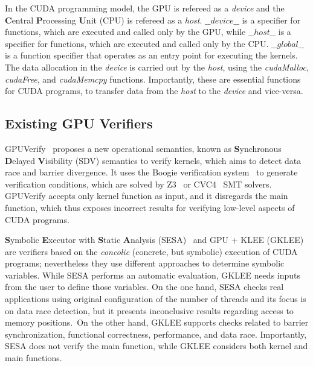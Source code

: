 \documentclass[times, doublespace]{cpeauth}
\begin{document}
In the CUDA programming model, the GPU is refereed as a \textit{device} and the \textbf{C}entral \textbf{P}rocessing \textbf{U}nit (CPU) is refereed as a \textit{host}. $\_\_device\_\_$ is a specifier for functions, which are executed and called only by the GPU, while $\_\_host\_\_$ is a specifier for functions, which are executed and called only by the CPU. $\_\_global\_\_$ is a function specifier that operates as an entry point for executing the kernels. The data allocation in the \textit{device} is carried out by the \textit{host}, using the \textit{cudaMalloc}, \textit{cudaFree}, and \textit{cudaMemcpy} functions. Importantly, these are essential functions for CUDA programs, to transfer data from the \textit{host} to the \textit{device} and vice-versa. 

\subsection{Existing GPU Verifiers}
\vspace{-2pt}
\label{ssec:trabalhos_relacionados}

GPUVerify~\cite{betts:2012} proposes a new operational semantics, known as \textbf{S}ynchronous \textbf{D}elayed \textbf{V}isibility (SDV) semantics to verify kernels, which aims to detect data race and barrier divergence. It uses the Boogie verification system~\cite{boogie:2011} to generate verification conditions, which are solved by Z3~\cite{Moura:2008} or CVC4~\cite{CVC4Barrett11} SMT solvers. GPUVerify accepts only kernel function as input, and it disregards the main function, which thus exposes incorrect results for verifying low-level aspects of CUDA programs.

\textbf{S}ymbolic \textbf{E}xecutor with \textbf{S}tatic \textbf{A}nalysis (SESA)~\cite{sesa:2014} and GPU + KLEE (GKLEE)~\cite{Li:2012} are verifiers based on the \textit{concolic} (concrete, but symbolic) execution of CUDA programs; nevertheless they use different approaches to determine symbolic variables. While SESA performs an automatic evaluation, GKLEE needs inputs from the user to define those variables. On the one hand, SESA checks real applications using original configuration of the number of threads and its focus is on data race detection, but it presents inconclusive results regarding access to memory positions.\ On the other hand, GKLEE supports checks related to barrier synchronization, functional correctness, performance, and data race. Importantly, SESA does not verify the main function, while GKLEE considers both kernel and main functions.
\end{document}
